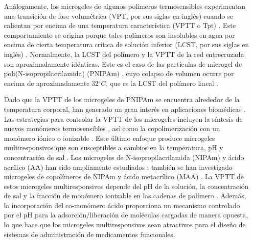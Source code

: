 An\'alogamente, los microgeles de algunos pol\'imeros termosensibles experimentan una transici\'on de fase volum\'etrica (VPT, por sus siglas en ingl\'es) cuando se calientan por encima de una temperatura caracter\'istica (VPTT o Tpt) \cite{Pelton1986,Pelton2000}.
Este comportamiento se origina porque tales pol\'imeros son insolubles en agua por encima de cierta temperatura cr\'itica de soluci\'on inferior (LCST, por sus siglas en ingl\'es) \cite{Kawaguchi2020}.
Normalmente, la LCST del pol\'imero y la VPTT de la red entrecruzada son aproximadamente id\'enticas.
Este es el caso de las part\'iculas de microgel de poli(N-isopropilacrilamida) (PNIPAm) \cite{Pelton1986}, cuyo colapso de volumen ocurre por encima de aproximadamente 32$^\circ C$, que es la LCST del pol\'imero lineal \cite{Schild1992}.

Dado que la VPTT de los microgeles de PNIPAm se encuentra alrededor de la temperatura corporal, han generado un gran inter\'es en aplicaciones biom\'edicas \cite{Guan2011}.
Las estrategias para controlar la VPTT de los microgeles incluyen la s\'intesis de nuevos mon\'omeros termosensibles \cite{Cai2007,Macchione2019}, as\'i como la copolimerizaci\'on con un mon\'omero i\'onico o ionizable \cite{Hirose1987,Lopez2020}.
Este \'ultimo enfoque produce microgeles multiresponsivos que son susceptibles a cambios en la temperatura, pH y concentraci\'on de sal \cite{snowden1996colloidal,Farooqi2017}.
Los microgeles de N-isopropilacrilamida (NIPAm) y \'acido acr\'ilico (AA) han sido ampliamente estudiados \cite{Morris1997,Jones2000,Bradley2005,Begum2016}; tambi\'en se han investigado microgeles de copol\'imeros de NIPAm y \'acido metacr\'ilico (MAA) \cite{Dowding2000,Hoare2004,Giussi2015}.
La VPTT de estos microgeles multiresponsivos depende del pH de la soluci\'on, la concentraci\'on de sal y la fracci\'on de mon\'omero ionizable en las cadenas de pol\'imero \cite{Morris1997,Jones2000,Hoare2004,Bradley2005,Lee2008,Wong2009,Hamzavi2016}.
Adem\'as, la incorporaci\'on del co-mon\'omero \'acido proporciona un mecanismo controlado por el pH para la adsorci\'on/liberaci\'on de mol\'eculas cargadas de manera opuesta, lo que hace que los microgeles multiresponsivos sean atractivos para el dise\~no de sistemas de administraci\'on de medicamentos funcionales\cite{Liu2017}.

